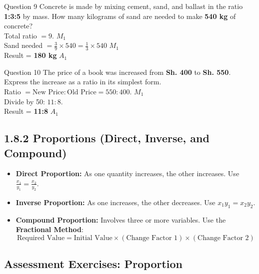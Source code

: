 \documentclass[12pt, a4paper, oneside]{article}
\begin{document}
\begin{solvingbox}{Question 9}
Concrete is made by mixing cement, sand, and ballast in the ratio \textbf{1:3:5} by mass. How many kilograms of sand are needed to make \textbf{540 kg} of concrete? \\
Total ratio $= 9$. \hfill $M_1$ \\
Sand needed $= \frac{3}{9} \times 540 = \frac{1}{3} \times 540$ \hfill $M_1$ \\
Result = \textbf{180 kg} \hfill $A_1$
\end{solvingbox}

\begin{solvingbox}{Question 10}
The price of a book was increased from \textbf{Sh. 400} to \textbf{Sh. 550}. Express the increase as a ratio in its simplest form. \\
Ratio $= \text{New Price} : \text{Old Price} = 550 : 400$. \hfill $M_1$ \\
Divide by 50: $11 : 8$. \\
Result = \textbf{11:8} \hfill $A_1$
\end{solvingbox}

\subsection*{1.8.2 Proportions (Direct, Inverse, and Compound)}

\begin{tcolorbox}[colback=lightgrey, colframe=primaryblue, title=\textbf{Teacher's Key Concept: The Logic of Proportion}, arc=5pt]
    \begin{itemize}
        \item \textbf{Direct Proportion:} As one quantity increases, the other increases. Use $\frac{x_1}{y_1} = \frac{x_2}{y_2}$.
        \item \textbf{Inverse Proportion:} As one increases, the other decreases. Use $x_1 y_1 = x_2 y_2$.
        \item \textbf{Compound Proportion:} Involves three or more variables. Use the \textbf{Fractional Method}:
        $$\text{Required Value} = \text{Initial Value} \times \left( \text{Change Factor 1} \right) \times \left( \text{Change Factor 2} \right)$$
    \end{itemize}
\end{tcolorbox}

\subsection*{Assessment Exercises: Proportion}
\end{document}
